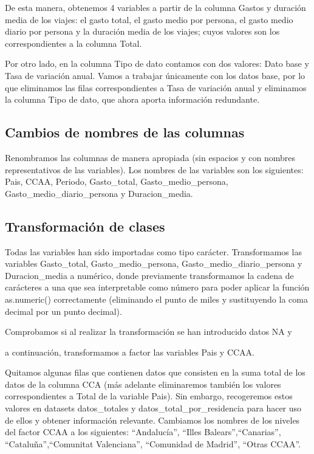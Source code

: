 \documentclass[data,article,submit,moreauthors,pdftex]{Definitions/mdpi}
\begin{document}
De esta manera, obtenemos 4 variables a partir de la columna Gastos y
duración media de los viajes: el gasto total, el gasto medio por
persona, el gasto medio diario por persona y la duración media de los
viajes; cuyos valores son los correspondientes a la columna Total.

Por otro lado, en la columna Tipo de dato contamos con dos valores: Dato
base y Tasa de variación anual. Vamos a trabajar únicamente con los
datos base, por lo que eliminamos las filas correspondientes a Tasa de
variación anual y eliminamos la columna Tipo de dato, que ahora aporta
información redundante.

\subsection{Cambios de nombres de las
columnas}\label{cambios-de-nombres-de-las-columnas}

Renombramos las columnas de manera apropiada (sin espacios y con nombres
representativos de las variables). Los nombres de las variables son los
siguientes: Pais, CCAA, Periodo, Gasto\_total, Gasto\_medio\_persona,
Gasto\_medio\_diario\_persona y Duracion\_media.

\subsection{Transformación de clases}\label{transformaciuxf3n-de-clases}

Todas las variables han sido importadas como tipo carácter.
Transformamos las variables Gasto\_total, Gasto\_medio\_persona,
Gasto\_medio\_diario\_persona y Duracion\_media a numérico, donde
previamente transformamos la cadena de carácteres a una que sea
interpretable como número para poder aplicar la función as.numeric()
correctamente (eliminando el punto de miles y sustituyendo la coma
decimal por un punto decimal).

Comprobamos si al realizar la transformación se han introducido datos NA
y

a continuación, transformamos a factor las variables Pais y CCAA.

Quitamos algunas filas que contienen datos que consisten en la suma
total de los datos de la columna CCA (más adelante eliminaremos también
los valores correspondientes a Total de la variable Pais). Sin embargo,
recogeremos estos valores en datasets datos\_totales y
datos\_total\_por\_residencia para hacer uso de ellos y obtener
información relevante. Cambiamos los nombres de los niveles del factor
CCAA a los siguientes: ``Andalucía'', ``Illes Balears'',``Canarias'',
``Cataluña'',``Comunitat Valenciana'', ``Comunidad de Madrid'', ``Otras
CCAA''.
\end{document}
